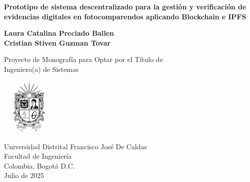 \begin{titlepage}
    \begin{center}
        \vspace*{0.5cm}
            
        \Large
        \textbf{Prototipo de sistema descentralizado para la gestión y verificación de evidencias digitales en fotocomparendos aplicando Blockchain e IPFS}
            
        
        \vspace{2.5cm}
            
        \normalsize
        \textbf{Laura Catalina Preciado Ballen}\\
        \textbf{Cristian Stiven Guzman Tovar}
            
        \vfill
            
        Proyecto de Monografía para Optar por el Título de\\
        Ingeniero(a) de Sistemas
            
        \vspace{0.8cm}
            
        \includegraphics[width=0.2\textwidth]{Images/Escudo_UD}
            
        \large
        Universidad Distrital Francisco José De Caldas\\
        Facultad de Ingeniería\\
        Colombia, Bogotá D.C.\\
        Julio de 2025\\

        
            
    \end{center}
\end{titlepage}